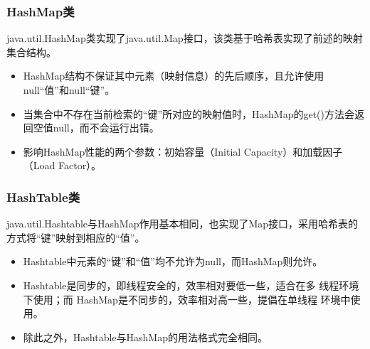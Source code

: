 \begin{frame}[fragile] %
  \frametitle{HashMap类}

  java.util.HashMap类实现了java.util.Map接口，该类基于{\hei\Blue 哈希表}实现了前述的映射集合结构。

  \begin{itemize}\kai
  \item HashMap结构不保证其中元素（映射信息）的先后顺序，且允许使用null“值”和null“键”。
  \item 当集合中不存在当前检索的“键”所对应的映射值时，HashMap的get()方法会返回空值null，而不会运行出错。
  \item 影响HashMap性能的两个参数：初始容量（Initial Capacity）和加载因子（Load Factor）。
  \end{itemize}
\end{frame}

\begin{frame}[fragile] %
  \frametitle{HashTable类}

  java.util.Hashtable与HashMap作用基本相同，也实现了Map接口，采用哈希表的方式将“键”映射到相应的“值”。


  \begin{itemize}\kai
  \item Hashtable中元素的“键”和“值”均不允许为null，而HashMap则允许。
  \item {\Red Hashtable是同步的，即线程安全的，效率相对要低一些，适合在多
      线程环境下使用；而 HashMap是不同步的，效率相对高一些，提倡在单线程
      环境中使用。}
  \item 除此之外，Hashtable与HashMap的用法格式完全相同。
  \end{itemize}
\end{frame}

